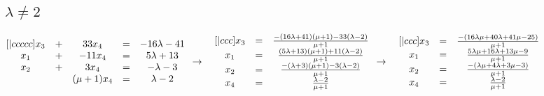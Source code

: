 \documentclass{article}
\begin{document}
    \subsection{\(\lambda \neq 2\)}
    \begin{math}
       \begin{matrix}[|ccccc]
            x_3 & + & 33x_4 & = & -16\lambda - 41\\
            x_1 & + & -11x_4 & = & 5\lambda + 13\\
            x_2 & + & 3x_4 & = & -\lambda - 3\\
            ~ & ~ & (\mu + 1)x_4 & = & \lambda - 2\\
        \end{matrix}\\
        \\
        \\
        \to\quad
        \begin{matrix}[|ccc]
            x_3 & = & \frac{-(16\lambda + 41)(\mu + 1) - 33(\lambda - 2)}{\mu + 1}\\
            x_1 & = & \frac{(5\lambda + 13)(\mu + 1) + 11(\lambda - 2)}{\mu + 1}\\
            x_2 & = & \frac{-(\lambda + 3)(\mu + 1) - 3(\lambda - 2)}{\mu + 1}\\
            x_4 & = & \frac{\lambda - 2}{\mu + 1}
        \end{matrix}\\
        \\
        \\
        \to\quad
        \begin{matrix}[|ccc]
            x_3 & = & \frac{-(16\lambda\mu + 40\lambda + 41\mu - 25)}{\mu + 1}\\
            x_1 & = & \frac{5\lambda\mu + 16\lambda + 13\mu - 9}{\mu + 1}\\
            x_2 & = & \frac{-(\lambda\mu + 4\lambda + 3\mu -3)}{\mu + 1}\\
            x_4 & = & \frac{\lambda - 2}{\mu + 1}
        \end{matrix}
    \end{math}
\end{document}
